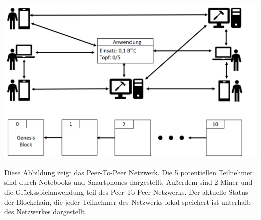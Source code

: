 \vspace{1cm}
\begin{minipage}{0.55\textwidth}
\includegraphics[width=\textwidth]{Figures/konzept_btc/konzept1}
\centering
\decoRule
{}
\end{minipage}
\begin{minipage}{0.45\textwidth}
Diese Abbildung zeigt das Peer-To-Peer Netzwerk. Die 5 potentiellen Teilnehmer sind durch Notebooks und Smartphones dargestellt. Außerdem sind 2 Miner und die Glücksspielanwendung teil des Peer-To-Peer Netzwerks. Der aktuelle Status der Blockchain, die jeder Teilnehmer des Netzwerks lokal speichert ist unterhalb des Netzwerkes dargestellt.
\end{minipage}

